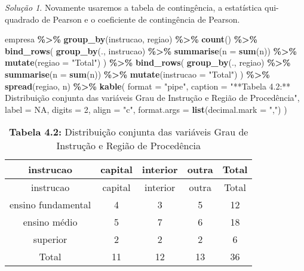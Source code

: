 \documentclass[
]{latex/krantz}
\newenvironment{Shaded}{\begin{snugshade}}{\end{snugshade}}
\newcommand{\AttributeTok}[1]{\textcolor[rgb]{0.13,0.29,0.53}{#1}}
\newcommand{\ConstantTok}[1]{\textcolor[rgb]{0.56,0.35,0.01}{#1}}
\newcommand{\DecValTok}[1]{\textcolor[rgb]{0.00,0.00,0.81}{#1}}
\newcommand{\FunctionTok}[1]{\textcolor[rgb]{0.13,0.29,0.53}{\textbf{#1}}}
\newcommand{\NormalTok}[1]{#1}
\newcommand{\SpecialCharTok}[1]{\textcolor[rgb]{0.81,0.36,0.00}{\textbf{#1}}}
\newcommand{\StringTok}[1]{\textcolor[rgb]{0.31,0.60,0.02}{#1}}
\theoremstyle{definition}
\theoremstyle{definition}
\theoremstyle{definition}
\theoremstyle{definition}
\theoremstyle{remark}
\newtheorem*{solution}{Solução}
\begin{document}
\begin{solution}
Novamente usaremos a tabela de contingência, a estatística qui-quadrado de Pearson e o coeficiente de contingência de Pearson.

\begin{Shaded}
\begin{Highlighting}[]
\NormalTok{empresa }\SpecialCharTok{\%\textgreater{}\%}
  \FunctionTok{group\_by}\NormalTok{(instrucao, regiao) }\SpecialCharTok{\%\textgreater{}\%}
  \FunctionTok{count}\NormalTok{() }\SpecialCharTok{\%\textgreater{}\%}
  \FunctionTok{bind\_rows}\NormalTok{(}
    \FunctionTok{group\_by}\NormalTok{(., instrucao) }\SpecialCharTok{\%\textgreater{}\%}
      \FunctionTok{summarise}\NormalTok{(}\AttributeTok{n =} \FunctionTok{sum}\NormalTok{(n)) }\SpecialCharTok{\%\textgreater{}\%}
      \FunctionTok{mutate}\NormalTok{(}\AttributeTok{regiao =} \StringTok{"Total"}\NormalTok{)}
\NormalTok{  ) }\SpecialCharTok{\%\textgreater{}\%}
  \FunctionTok{bind\_rows}\NormalTok{(}
    \FunctionTok{group\_by}\NormalTok{(., regiao) }\SpecialCharTok{\%\textgreater{}\%}
      \FunctionTok{summarise}\NormalTok{(}\AttributeTok{n =} \FunctionTok{sum}\NormalTok{(n)) }\SpecialCharTok{\%\textgreater{}\%}
      \FunctionTok{mutate}\NormalTok{(}\AttributeTok{instrucao =} \StringTok{"Total"}\NormalTok{)}
\NormalTok{  ) }\SpecialCharTok{\%\textgreater{}\%}
  \FunctionTok{spread}\NormalTok{(regiao, n) }\SpecialCharTok{\%\textgreater{}\%}
  \FunctionTok{kable}\NormalTok{(}
    \AttributeTok{format =} \StringTok{"pipe"}\NormalTok{,}
    \AttributeTok{caption =} \StringTok{"**Tabela 4.2:** Distribuição conjunta das variáveis Grau de Instrução e Região de Procedência"}\NormalTok{,}
    \AttributeTok{label =} \ConstantTok{NA}\NormalTok{,}
    \AttributeTok{digits =} \DecValTok{2}\NormalTok{,}
    \AttributeTok{align =} \StringTok{"c"}\NormalTok{,}
    \AttributeTok{format.args =} \FunctionTok{list}\NormalTok{(}\AttributeTok{decimal.mark =} \StringTok{","}\NormalTok{)}
\NormalTok{  )}
\end{Highlighting}
\end{Shaded}

\begin{longtable}[]{@{}ccccc@{}}
\caption{\textbf{Tabela 4.2:} Distribuição conjunta das variáveis Grau de Instrução e Região de Procedência}\tabularnewline
\toprule\noalign{}
instrucao & capital & interior & outra & Total \\
\midrule\noalign{}
\endfirsthead
\toprule\noalign{}
instrucao & capital & interior & outra & Total \\
\midrule\noalign{}
\endhead
\bottomrule\noalign{}
\endlastfoot
ensino fundamental & 4 & 3 & 5 & 12 \\
ensino médio & 5 & 7 & 6 & 18 \\
superior & 2 & 2 & 2 & 6 \\
Total & 11 & 12 & 13 & 36 \\
\end{longtable}


\end{solution}
\end{document}
